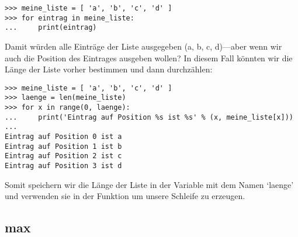 \begin{Verbatim}[frame=single]
>>> meine_liste = [ 'a', 'b', 'c', 'd' ]
>>> for eintrag in meine_liste:
...     print(eintrag)
\end{Verbatim}

\noindent
Damit würden alle Einträge der Liste ausgegeben (a, b, c, d)---aber wenn wir auch die Position des Eintrages ausgeben wollen? In diesem Fall könnten wir die Länge der Liste vorher bestimmen und dann durchzählen:

\begin{Verbatim}[frame=single]
>>> meine_liste = [ 'a', 'b', 'c', 'd' ]
>>> laenge = len(meine_liste)
>>> for x in range(0, laenge):
...     print('Eintrag auf Position %s ist %s' % (x, meine_liste[x]))
...
Eintrag auf Position 0 ist a
Eintrag auf Position 1 ist b
Eintrag auf Position 2 ist c
Eintrag auf Position 3 ist d
\end{Verbatim}

\noindent
Somit speichern wir die Länge der Liste in der Variable mit dem Namen `laenge' und verwenden sie in der  Funktion um unsere Schleife zu erzeugen.

\subsection*{max}

